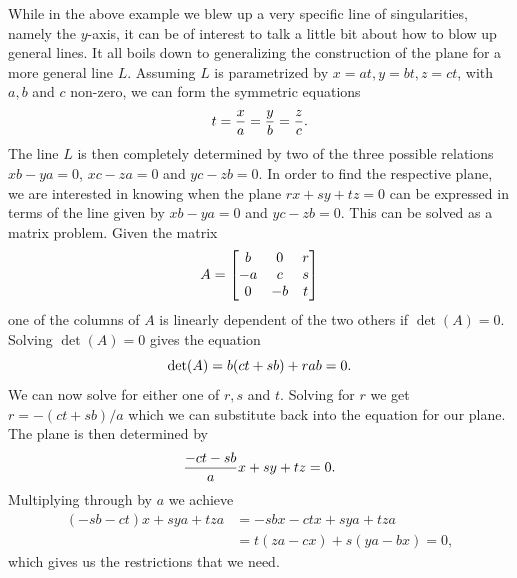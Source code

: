 \documentclass{article}
\begin{document}
    While in the above example we blew up a very specific line of
    singularities, namely the $y$-axis, it can be of interest to talk a little
    bit about how to blow up general lines. It all boils down to generalizing
    the construction of the plane for a more general line $L$. Assuming $L$ is
    parametrized by $x = at, y = bt, z = ct$, with $a, b$ and $c$ non-zero, we
    can form the symmetric equations 
    \begin{equation}
        \notag
        t = \frac{x}{a} = \frac{y}{b} = \frac{z}{c}.
    \end{equation}
    The line $L$ is then completely determined by two of the three possible
    relations $xb - ya = 0$, $xc - za = 0$ and $yc - zb = 0$.  In order to find
    the respective plane, we are interested in knowing when the plane $rx + sy
    + tz = 0$ can be expressed in terms of the line given by $xb - ya = 0$ and
    $yc - zb = 0$. This can be solved as a matrix problem. Given the matrix
    \begin{equation}
        \notag
        A = \begin{bmatrix}
            b & 0 & r \\
            -a & c & s \\
            0 & -b & t
        \end{bmatrix}
    \end{equation}
    one of the columns of $A$ is linearly dependent of the two others if
    $\det(A) = 0$. Solving $\det(A) = 0$ gives the equation
    \begin{equation}
        \notag
        \det(A) = b(ct + sb) + rab = 0.
    \end{equation}
    We can now solve for either one of $r, s$ and $t$. Solving for $r$ we get
    $r = -( ct + sb ) / a$ which we can substitute back into the equation for
    our plane.  The plane is then determined by 
    \begin{equation}
        \notag
        \frac{-ct - sb}{a}x + sy + tz = 0.
    \end{equation}
    Multiplying through by $a$ we achieve
    \begin{align*}
        (-sb - ct)x + sya + tza &= -sbx - ctx + sya + tza \\
                                &= t(za - cx) + s(ya - bx) = 0,
    \end{align*}
    which gives us the restrictions that we need.
    \clearpage
    \printbibliography \printindex
\end{document}
